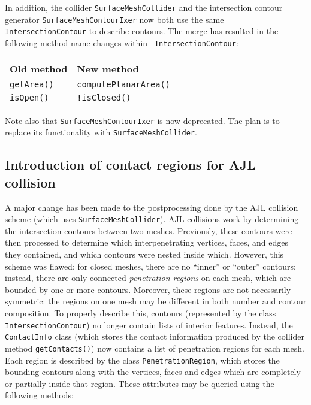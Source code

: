 \documentclass{article}
\begin{document}
In addition, the collider {\tt SurfaceMeshCollider} and the
intersection contour generator {\tt SurfaceMeshContourIxer} now both
use the same {\tt IntersectionContour} to describe contours.  The
merge has resulted in the following method name changes within {\tt
IntersectionContour}:

\begin{tabular}{lll}
\hline
Old method & New method \\
\hline
{\tt getArea()} & {\tt computePlanarArea()}\\
{\tt isOpen()} & {\tt !isClosed()}\\
\hline
\end{tabular}

\begin{sideblock}
Note also that {\tt SurfaceMeshContourIxer} is now deprecated. The
plan is to replace its functionality with {\tt SurfaceMeshCollider}.
\end{sideblock}

\subsection*{Introduction of contact regions for AJL collision}

A major change has been made to the postprocessing done by the AJL
collision scheme (which uses {\tt SurfaceMeshCollider}).  AJL
collisions work by determining the intersection contours between two
meshes. Previously, these contours were then processed to determine
which interpenetrating vertices, faces, and edges they contained, and
which contours were nested inside which. However, this scheme was
flawed: for closed meshes, there are no ``inner'' or ``outer''
contours; instead, there are only connected {\it penetration regions} on
each mesh, which are bounded by one or more contours.  Moreover, these
regions are not necessarily symmetric: the regions on one mesh may be
different in both number and contour composition. To properly describe
this, contours (represented by the class {\tt IntersectionContour}) no
longer contain lists of interior features. Instead, the {\tt
ContactInfo} class (which stores the contact information produced by
the collider method {\tt getContacts()}) now contains a list of
penetration regions for each mesh. Each region is described by the
class {\tt PenetrationRegion}, which stores the bounding contours
along with the vertices, faces and edges which are completely or
partially inside that region. These attributes may be queried using
the following methods:
\end{document}
